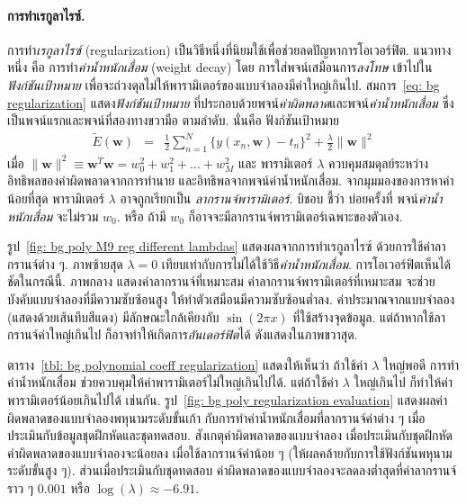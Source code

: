 \paragraph{การทำเรกูลาไรซ์.}
การทำ\textit{เรกูลาไรซ์} (regularization)
เป็นวิธีหนึ่งที่นิยมใช้เพื่อช่วยลดปัญหาการโอเวอร์ฟิต.
แนวทางหนึ่ง คือ การทำ\textit{ค่าน้ำหนักเสื่อม} (weight decay)
โดย การใส่พจน์เสมือนการ\textit{ลงโทษ} เข้าไปใน\textit{ฟังก์ชันเป้าหมาย}
เพื่อจะถ่วงดุลไม่ให้พารามิเตอร์ของแบบจำลองมีค่าใหญ่เกินไป.
สมการ~\ref{eq: bg regularization} แสดง\textit{ฟังก์ชันเป้าหมาย}
ที่ประกอบด้วยพจน์\textit{ค่าผิดพลาด}และพจน์\textit{ค่าน้ำหนักเสื่อม} 
ซึ่งเป็นพจน์แรกและพจน์ที่สองทางขวามือ ตามลำดับ.
%
นั่นคือ ฟังก์ชันเป้าหมาย
\begin{eqnarray}
\tilde{E}(\mathbf{w}) &=& \frac{1}{2} \sum_{n=1}^N \{ y(x_n, \mathbf{w}) - t_n \}^2 + \frac{\lambda}{2} \| \mathbf{w} \|^2
\label{eq: bg regularization}
\end{eqnarray}
เมื่อ $\| \mathbf{w} \|^2 \equiv \mathbf{w}^T \mathbf{w} = w_0^2 + w_1^2 + \ldots + w_M^2$ และ พารามิเตอร์ $\lambda$ ควบคุมสมดุลย์ระหว่างอิทธิพลของค่าผิดพลาดจากการทำนาย และอิทธิพลจากพจน์ค่าน้ำหนักเสื่อม.
%
จากมุมมองของการหาค่าน้อยที่สุด 
พารามิเตอร์ $\lambda$ อาจถูกเรียกเป็น \textit{ลากรานจ์พารามิเตอร์}.
%
บิชอบ\cite{Bishop2006a} ชี้ว่า บ่อยครั้งที่ พจน์\textit{ค่าน้ำหนักเสื่อม} จะไม่รวม $w_0$.
หรือ ถ้ามี $w_0$ ก็อาจจะมีลากรานจ์พารามิเตอร์เฉพาะของตัวเอง.

รูป~\ref{fig: bg poly M9 reg different lambdas} แสดงผลจากการทำเรกูลาไรซ์ ด้วยการใช้ค่าลากรานจ์ต่าง ๆ.
ภาพซ้ายสุด $\lambda = 0$ เทียบเท่ากับการไม่ได้ใช้วิธี\textit{ค่าน้ำหนักเสื่อม}.
{การโอเวอร์ฟิต}เห็นได้ชัดในกรณีนี้.
ภาพกลาง แสดงค่า{ลากรานจ์}ที่เหมาะสม 
ค่า{ลากรานจ์}พารามิเตอร์ที่เหมาะสม จะช่วยบังคับแบบจำลองที่มีความซับซ้อนสูง
ให้ทำตัวเสมือนมีความซับซ้อนต่ำลง.
ค่าประมาณจากแบบจำลอง (แสดงด้วยเส้นทึบสีแดง) มีลักษณะใกล้เคียงกับ $\sin(2 \pi x)$ ที่ใช้สร้างจุดข้อมูล.
แต่ถ้าหากใช้ลากรานจ์ค่าใหญ่เกินไป ก็อาจทำให้เกิดการ\textit{อันเดอร์ฟิต}ได้ 
ดังแสดงในภาพขวาสุด.

ตาราง~\ref{tbl: bg polynomial coeff regularization} แสดงให้เห็นว่า
ถ้าใช้ค่า $\lambda$ ใหญ่พอดี
การทำค่าน้ำหนักเสื่อม ช่วยควบคุมให้ค่าพารามิเตอร์ไม่ใหญ่เกินไปได้.
แต่ถ้าใช้ค่า $\lambda$ ใหญ่เกินไป 
ก็ทำให้ค่าพารามิเตอร์น้อยเกินไปได้ เช่นกัน.
รูป~\ref{fig: bg poly regularization evaluation} แสดงผลค่าผิดพลาดของแบบจำลองพหุนามระดับขั้นเก้า กับการทำค่าน้ำหนักเสื่อมที่ลากรานจ์ค่าต่าง ๆ 
เมื่อประเมินกับข้อมูลชุดฝึกหัดและชุดทดสอบ.
สังเกตุค่าผิดพลาดของแบบจำลอง 
เมื่อประเมินกับชุดฝึกหัด ค่าผิดพลาดของแบบจำลองจะน้อยลง เมื่อใช้ลากรานจ์ค่าน้อย ๆ (ให้ผลคล้ายกับการใช้ฟังก์ชันพหุนามระดับขั้นสูง ๆ).
ส่วนเมื่อประเมินกับชุดทดสอบ ค่าผิดพลาดของแบบจำลองจะลดลงต่ำสุดที่ค่าลากรานจ์ราว ๆ $0.001$ หรือ $\log(\lambda) \approx -6.91$.

